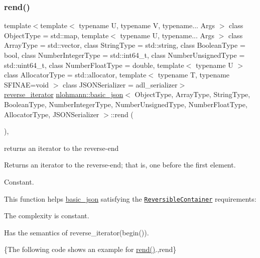 \subsubsection{\texorpdfstring{rend()}{rend()}\hspace{0.1cm}{\footnotesize\ttfamily [1/2]}}
{\footnotesize\ttfamily template$<$template$<$ typename U, typename V, typename... Args $>$ class Object\+Type = std\+::map, template$<$ typename U, typename... Args $>$ class Array\+Type = std\+::vector, class String\+Type  = std\+::string, class Boolean\+Type  = bool, class Number\+Integer\+Type  = std\+::int64\+\_\+t, class Number\+Unsigned\+Type  = std\+::uint64\+\_\+t, class Number\+Float\+Type  = double, template$<$ typename U $>$ class Allocator\+Type = std\+::allocator, template$<$ typename T, typename S\+F\+I\+N\+A\+E=void $>$ class J\+S\+O\+N\+Serializer = adl\+\_\+serializer$>$ \\
\mbox{\hyperlink{classnlohmann_1_1basic__json_ac223d5560c2b05a208c88de67376c5f2}{reverse\+\_\+iterator}} \mbox{\hyperlink{classnlohmann_1_1basic__json}{nlohmann\+::basic\+\_\+json}}$<$ Object\+Type, Array\+Type, String\+Type, Boolean\+Type, Number\+Integer\+Type, Number\+Unsigned\+Type, Number\+Float\+Type, Allocator\+Type, J\+S\+O\+N\+Serializer $>$\+::rend (\begin{DoxyParamCaption}{ }\end{DoxyParamCaption})\hspace{0.3cm}{\ttfamily [inline]}, {\ttfamily [noexcept]}}



returns an iterator to the reverse-\/end 

Returns an iterator to the reverse-\/end; that is, one before the first element.

  Constant.

This function helps {\ttfamily \mbox{\hyperlink{classnlohmann_1_1basic__json}{basic\+\_\+json}}} satisfying the \href{http://en.cppreference.com/w/cpp/concept/ReversibleContainer}{\tt Reversible\+Container} requirements\+:
\begin{DoxyItemize}
\item The complexity is constant.
\item Has the semantics of {\ttfamily reverse\+\_\+iterator(begin())}.
\end{DoxyItemize}

\{The following code shows an example for {\ttfamily \mbox{\hyperlink{classnlohmann_1_1basic__json_ac77aed0925d447744676725ab0b6d535}{rend()}}}.,rend\}

